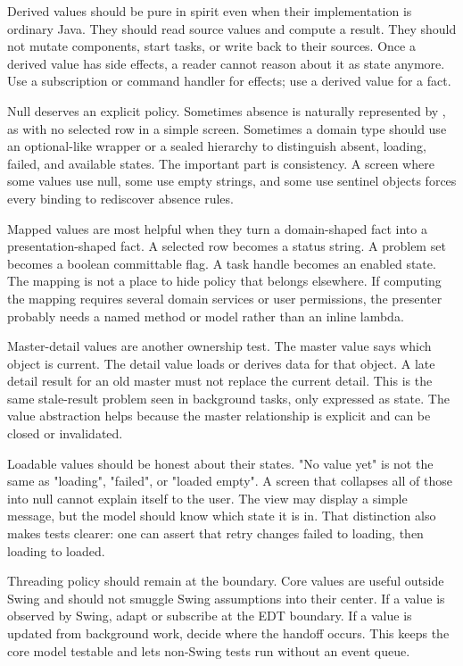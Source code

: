 Derived values should be pure in spirit even when their implementation is
ordinary Java. They should read source values and compute a result. They should
not mutate components, start tasks, or write back to their sources. Once a
derived value has side effects, a reader cannot reason about it as state
anymore. Use a subscription or command handler for effects; use a derived value
for a fact.

Null deserves an explicit policy. Sometimes absence is naturally represented by
, as with no selected row in a simple screen. Sometimes a domain type
should use an optional-like wrapper or a sealed hierarchy to distinguish absent,
loading, failed, and available states. The important part is consistency. A
screen where some values use null, some use empty strings, and some use sentinel
objects forces every binding to rediscover absence rules.

Mapped values are most helpful when they turn a domain-shaped fact into a
presentation-shaped fact. A selected row becomes a status string. A problem set
becomes a boolean committable flag. A task handle becomes an enabled state. The
mapping is not a place to hide policy that belongs elsewhere. If computing the
mapping requires several domain services or user permissions, the presenter
probably needs a named method or model rather than an inline lambda.

Master-detail values are another ownership test. The master value says which
object is current. The detail value loads or derives data for that object. A
late detail result for an old master must not replace the current detail. This
is the same stale-result problem seen in background tasks, only expressed as
state. The value abstraction helps because the master relationship is explicit
and can be closed or invalidated.

Loadable values should be honest about their states. "No value yet" is not the
same as "loading", "failed", or "loaded empty". A screen that collapses all of
those into null cannot explain itself to the user. The view may display a simple
message, but the model should know which state it is in. That distinction also
makes tests clearer: one can assert that retry changes failed to loading, then
loading to loaded.

Threading policy should remain at the boundary. Core values are useful outside
Swing and should not smuggle Swing assumptions into their center. If a value is
observed by Swing, adapt or subscribe at the EDT boundary. If a value is updated
from background work, decide where the handoff occurs. This keeps the core
model testable and lets non-Swing tests run without an event queue.

